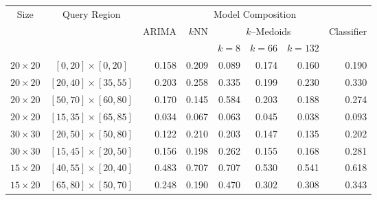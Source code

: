 \begin{table}[h]	
    \centering
	\small
	\begin{tabular}{|c|c|r|r|r|r|r|r|}
        \hline
        \multirow{3}{*}{Size} & \multirow{3}{*}{Query Region} & \multicolumn{6}{c|}{Model Composition} \\ 
        \cline{3-8}
        & & \multirow{2}{*}{ARIMA} & \multirow{2}{*}{$k$NN} & \multicolumn{3}{c|}{$k$--Medoids} & \multirow{2}{*}{Classifier} \\ 
        \cline{5-7}
        & & & & $k =8$ & $k = 66$ & $k = 132$ &  \\ \hline %
        $20 \times 20$ & $[ 0, 20] \times [ 0, 20]$ & 0.158 & 0.209 & 0.089 & 0.174 & 0.160 & \cellcolor{red!20}0.190  \\ %
        $20 \times 20$ & $[20, 40] \times [35, 55]$ & 0.203 & 0.258 & 0.335 & 0.199 & 0.230 & \cellcolor{red!20}0.330 \\ %
        $20 \times 20$ & $[50, 70] \times [60, 80]$ & 0.170 & 0.145 & 0.584 & 0.203 & 0.188 & \cellcolor{red!20}0.274 \\ %
        $20 \times 20$ & $[15, 35] \times [65, 85]$ & 0.034 & 0.067 & 0.063 & 0.045 & 0.038 & \cellcolor{red!20}0.093 \\ %
        $30 \times 30$ & $[20, 50] \times [50, 80]$ & 0.122 & 0.210 & 0.203 & 0.147 & 0.135 & \cellcolor{red!20}0.202 \\ %
        $30 \times 30$ & $[15, 45] \times [20, 50]$ & 0.156 & 0.198 & 0.262 & 0.155 & 0.168 & \cellcolor{red!20}0.281 \\ %
        $15 \times 20$ & $[40, 55] \times [20, 40]$ & 0.483 & 0.707 & 0.707 & 0.530 & 0.541 & \cellcolor{red!20}0.618 \\ %
        $15 \times 20$ & $[65, 80] \times [50, 70]$ & 0.248 & 0.190 & 0.470 & 0.302 & 0.308 & \cellcolor{red!20}0.343 \\ %

\end{tabular}
\end{table}
